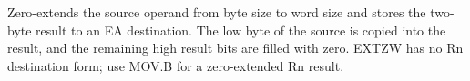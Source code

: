 Zero-extends the source operand from byte size to word size and stores the two-byte result to an EA destination. The low byte of the source is copied into the result, and the remaining high result bits are filled with zero. EXTZW has no Rn destination form; use MOV.B for a zero-extended Rn result.
